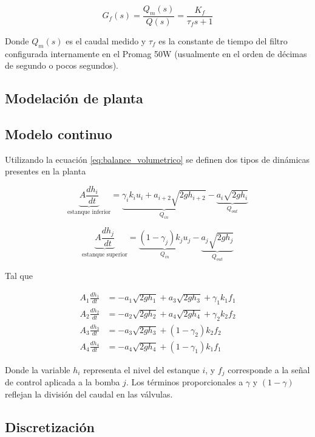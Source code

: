 \begin{equation}
  G_f(s) = \frac{Q_m(s)}{Q(s)} = \frac{K_f}{\tau_f s + 1}
  \label{eq:dinamica_flujo}
\end{equation}

Donde $Q_m(s)$ es el caudal medido y $\tau_f$ es la constante de tiempo del filtro configurada internamente en el Promag 50W (usualmente en el orden de décimas de segundo o pocos segundos).
\clearpage

\subsection{Modelación de planta}
\subsection{Modelo continuo}
Utilizando la ecuación \ref{eq:balance_volumetrico} se definen dos tipos de dinámicas presentes en la planta

$$
\underbrace{A\frac{dh_i}{dt}}_\text{estanque inferior} = \underbrace{\gamma_i k_i u_i + a_{i+2}\sqrt{2gh_{i+2}}}_{Q_{in}} - \underbrace{a_{i}\sqrt{2gh_{i}}}_{Q_{out}}
$$

$$
\underbrace{A\frac{dh_j}{dt}}_\text{estanque superior} = \underbrace{(1 - \gamma_j) k_j u_j}_{Q_{in}} - \underbrace{a_{j}\sqrt{2gh_{j}}}_{Q_{out}}
$$

Tal que 

\begin{align}
    A_1 \frac{dh_1}{dt} &= -a_1 \sqrt{2g h_1} + a_3 \sqrt{2g h_3} + \gamma_1 k_1 f_1 \label{eq:edo_h1} \\
    A_2 \frac{dh_2}{dt} &= -a_2 \sqrt{2g h_2} + a_4 \sqrt{2g h_4} + \gamma_2 k_2 f_2 \label{eq:edo_h2} \\
    A_3 \frac{dh_3}{dt} &= -a_3 \sqrt{2g h_3} + (1-\gamma_2) k_2 f_2 \label{eq:edo_h3} \\
    A_4 \frac{dh_4}{dt} &= -a_4 \sqrt{2g h_4} + (1-\gamma_1) k_1 f_1 \label{eq:edo_h4}
\end{align}

Donde la variable $h_i$ representa el nivel del estanque $i$, y $f_j$ corresponde a la señal de control aplicada a la bomba $j$. Los términos proporcionales a $\gamma$ y $(1-\gamma)$ reflejan la división del caudal en las válvulas.

\subsection{Discretización} %

